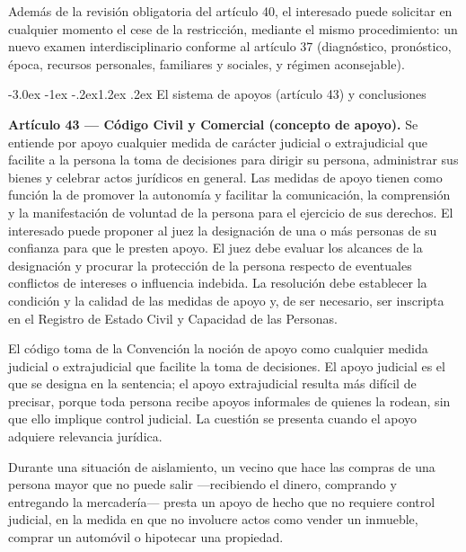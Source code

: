 \documentclass[12pt,oneside]{book}
\makeatletter
\renewcommand\section{\@startsection{section}{1}{\z@}%
  {-3.0ex \@plus -1ex \@minus -.2ex}{1.2ex \@plus .2ex}%
  {\normalfont\large\bfseries\color{acento}}}
\makeatother
\begin{document}
Además de la revisión obligatoria del artículo 40, el interesado puede solicitar en cualquier momento el cese de la restricción, mediante el mismo procedimiento: un nuevo examen interdisciplinario conforme al artículo 37 (diagnóstico, pronóstico, época, recursos personales, familiares y sociales, y régimen aconsejable).

\section{El sistema de apoyos (artículo 43) y conclusiones}

\begin{importante}
\textbf{Artículo 43 --- Código Civil y Comercial (concepto de apoyo).} Se entiende por apoyo cualquier medida de carácter judicial o extrajudicial que facilite a la persona la toma de decisiones para dirigir su persona, administrar sus bienes y celebrar actos jurídicos en general. Las medidas de apoyo tienen como función la de promover la autonomía y facilitar la comunicación, la comprensión y la manifestación de voluntad de la persona para el ejercicio de sus derechos. El interesado puede proponer al juez la designación de una o más personas de su confianza para que le presten apoyo. El juez debe evaluar los alcances de la designación y procurar la protección de la persona respecto de eventuales conflictos de intereses o influencia indebida. La resolución debe establecer la condición y la calidad de las medidas de apoyo y, de ser necesario, ser inscripta en el Registro de Estado Civil y Capacidad de las Personas.
\end{importante}

El código toma de la Convención la noción de apoyo como cualquier medida judicial o extrajudicial que facilite la toma de decisiones. El apoyo judicial es el que se designa en la sentencia; el apoyo extrajudicial resulta más difícil de precisar, porque toda persona recibe apoyos informales de quienes la rodean, sin que ello implique control judicial. La cuestión se presenta cuando el apoyo adquiere relevancia jurídica.

\begin{ejemplo}
Durante una situación de aislamiento, un vecino que hace las compras de una persona mayor que no puede salir ---recibiendo el dinero, comprando y entregando la mercadería--- presta un apoyo de hecho que no requiere control judicial, en la medida en que no involucre actos como vender un inmueble, comprar un automóvil o hipotecar una propiedad.
\end{ejemplo}
\end{document}
